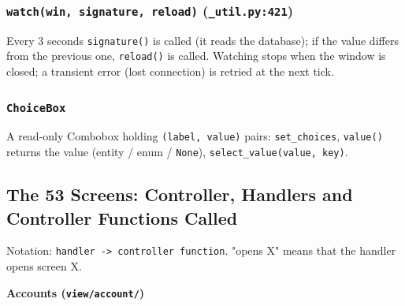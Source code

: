 \hypertarget{watchwin-signature-reload-_util.py421}{%
\subsubsection{\texorpdfstring{\texttt{watch(\allowbreak{}win,\allowbreak{} signature,\allowbreak{} reload)}
(\texttt{\_\allowbreak{}util.\allowbreak{}py:421})}{watch(win, signature, reload) (\_util.py:421)}}\label{watchwin-signature-reload-_util.py421}}

Every 3 seconds \texttt{signature(\allowbreak{})} is called (it reads the database);
if the value differs from the previous one, \texttt{reload(\allowbreak{})} is called.
Watching stops when the window is closed; a transient error (lost
connection) is retried at the next tick.

\hypertarget{choicebox}{%
\subsubsection{\texorpdfstring{\texttt{ChoiceBox}}{ChoiceBox}}\label{choicebox}}

A read-only Combobox holding \texttt{(\allowbreak{}label,\allowbreak{} value)} pairs:
\texttt{set\_\allowbreak{}choices}, \texttt{value(\allowbreak{})} returns the value (entity / enum
/ \texttt{None}), \texttt{select\_\allowbreak{}value(\allowbreak{}value,\allowbreak{} key)}.

\hypertarget{sec:impl-screens-table}{%
\subsection{The 53 Screens: Controller, Handlers and Controller
Functions Called}\label{sec:impl-screens-table}}

Notation: \texttt{handler -\textgreater{}\allowbreak{} controller function}.
"opens X" means that the handler opens screen X.

\textbf{Accounts (\texttt{view/\allowbreak{}account/\allowbreak{}})}

